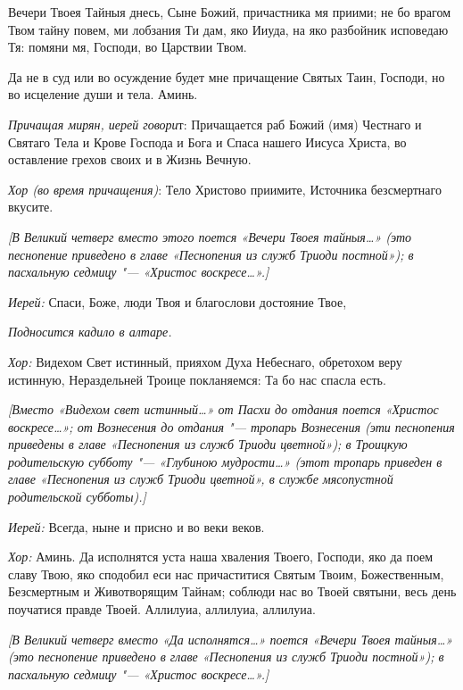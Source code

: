 \begin{mymulticols}
Вечери Твоея Тайныя днесь, Сыне Божий, причастника мя приими; не бо врагом Твом тайну повем, ми лобзания Ти дам, яко Ииуда, на яко разбойник исповедаю Тя: помяни мя, Господи, во Царствии Твом.

Да не в суд или во осуждение будет мне причащение Святых Таин, Господи, но во исцеление души и тела. Аминь.


{\itshape Причащая мирян, иерей говори}т: Причащается раб Божий (имя) Честнаго и Святаго Тела и Крове Господа и Бога и Спаса нашего Иисуса Христа, во оставление грехов своих и в Жизнь Вечную. 

{\itshape Хор (во время причащения)}: Тело Христово приимите, Источника безсмертнаго вкусите.

{\itshape [В Великий четверг вместо этого поется «Вечери Твоея тайныя…» (это песнопение приведено в главе «Песнопения из служб Триоди постной»); в пасхальную седмицу "--- «Христос воскресе…».]}

{\itshape Иерей:} Спаси, Боже, люди Твоя и благослови достояние Твое, 

{\itshape Подносится кадило в алтаре.} 

{\itshape Хор:} Видехом Свет истинный, прияхом Духа Небеснаго, обретохом веру истинную, Нераздельней Троице покланяемся: Та бо нас спасла есть.

{\itshape [Вместо «Видехом свет истинный…» от Пасхи до отдания поется «Христос воскресе…»; от Вознесения до отдания "--- тропарь Вознесения (эти песнопения приведены в главе «Песнопения из служб Триоди цветной»); в Троицкую родительскую субботу "--- «Глубиною мудрости…» (этот тропарь приведен в главе «Песнопения из служб Триоди цветной», в службе мясопустной родительской субботы).]}

{\itshape Иерей:} Всегда, ныне и присно и во веки веков.

{\itshape Хор:} Аминь. Да исполнятся уста наша хваления Твоего, Господи, яко да поем славу Твою, яко сподобил еси нас причаститися Святым Твоим, Божественным, Безсмертным и Животворящим Тайнам; соблюди нас во Твоей святыни, весь день поучатися правде Твоей. Аллилуиа, аллилуиа, аллилуиа. 

{\itshape [В Великий четверг вместо «Да исполнятся…» поется «Вечери Твоея тайныя…» (это песнопение приведено в главе «Песнопения из служб Триоди постной»); в пасхальную седмицу "--- «Христос воскресе…».]}



\end{mymulticols}
